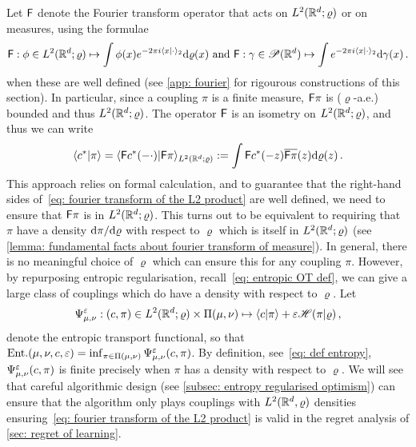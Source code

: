 Let $\mathsf{F}$ denote the Fourier transform operator that acts on $L^2(\mathbb{R}^d;\varrho)$ or on measures, using the formulae
\begin{align*}
    \mathsf{F}: \phi\in L^2(\mathbb{R}^d;\varrho)\mapsto\int \phi(x)e^{-2\pi i\langle x\vert \cdot\rangle_2}\mathrm{d}\varrho(x) \mbox{ and } \mathsf{F}:\gamma\in \mathscr{P}(\mathbb{R}^d)\mapsto \int e^{-2\pi i\langle x\vert\cdot\rangle_2}\mathrm{d}\gamma(x) \,.
\end{align*}
when these are well defined (see \cref{app: fourier} for rigourous constructions of this section). In particular, since a coupling $\pi$ is a finite measure, $\mathsf{F}\pi$ is ($\varrho$-a.e.) bounded and thus $L^2(\mathbb{R}^d;\varrho)$. The operator $\mathsf{F}$ is an isometry on $L^2(\mathbb{R}^d;\varrho)$, and thus we can write
\begin{align}
    \langle c^*\vert\pi\rangle = \langle \mathsf{F} c^*(-\cdot)\vert\mathsf{F}\pi\rangle_{L^2(\mathbb{R}^d;\varrho)}:=\int \mathsf{F} c^*(-z)\overline{\mathsf{F}\pi}(z)\mathrm{d} \varrho(z) \,.\label{eq: fourier transform of the L2 product}
\end{align} 
This approach relies on formal calculation, and to guarantee that the right-hand sides of~\eqref{eq: fourier transform of the L2 product} are well defined, we need to ensure that $\mathsf{F}\pi$ is in $L^2(\mathbb{R}^d;\varrho)$. This turns out to be equivalent to requiring that $\pi$ have a density $\mathrm{d}\pi/\mathrm{d}\varrho$ with respect to $\varrho$ which is itself in $L^2(\mathbb{R}^d;\varrho)$ (see \cref{lemma: fundamental facts about fourier transform of measure}). 
%
In general, there is no meaningful choice of $\varrho$ which can ensure this for any coupling $\pi$. However, by repurposing entropic regularisation, recall~\eqref{eq: entropic OT def}, we can give a large class of couplings which do have a density with respect to $\varrho$. Let 
\begin{align}
    \Psi_{\mu,\nu}^\varepsilon:(c,\pi)\in L^2(\mathbb{R}^d;\varrho)\times\Pi(\mu,\nu)\mapsto \langle c\vert\pi\rangle + \varepsilon\mathscr{H}(\pi\vert\varrho)\,,\label{eq: entropic functional}
\end{align}
denote the entropic transport functional, so that $\text{Ent.}(\mu,\nu,c,\varepsilon)=\inf_{\pi\in\Pi(\mu,\nu)}\Psi_{\mu,\nu}^\varepsilon(c,\pi)$. By definition, see~\eqref{eq: def entropy}, $\Psi_{\mu,\nu}^\varepsilon(c,\pi)$ is finite precisely when $\pi$ has a density with respect to $\varrho$. We will see that careful algorithmic design (see \cref{subsec: entropy regularised optimism}) can ensure that the algorithm only plays couplings with $L^2(\mathbb{R}^d,\varrho)$ densities ensuring~\eqref{eq: fourier transform of the L2 product} is valid in the regret analysis of \cref{sec: regret of learning}.

